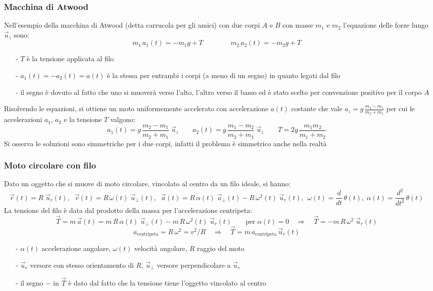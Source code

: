 \documentclass[a4paper]{article}
\newcommand\uz{\vec{u}_z}
\newcommand\ur{\vec{u}_r}
\newcommand\uper{\vec{u}_\perp}
\newcommand\dt{\frac{d}{dt}\,}
\newcommand\dts{\frac{d^2}{dt^2}\,}
\begin{document}
\subsubsection*{Macchina di Atwood}
Nell'esempio della macchina di Atwood (detta carrucola per gli amici) con due corpi \(A\) e \(B\) con masse \(m_1\) e \(m_2\)
l'equazione delle forze lungo \(\uz\) sono:
\[m_1 \, a_1(t) = -m_1 g + T \qquad\qquad m_2 \, a_2(t) = -m_2 g + T \]
\begin{itemize}[topsep=3pt, itemsep=0pt]
	\item[-] \(T\) è la tensione applicata al filo
	\item[-] \(a_1(t) = -a_2(t) = a(t)\) è la stessa per entrambi i corpi (a meno di un segno) in quanto legati dal filo
	\item[-] il	segno è dovuto al fatto che uno si muoverà verso l'alto, l'altro verso il basso ed è stato scelto per convenzione
	positivo per il corpo \(A\)
\end{itemize}
Risolvendo le equazioni, si ottiene un moto uniformemente accelerato con accelerazione \(a(t)\) costante che vale
\(\displaystyle a_z = g \, \frac{m_2 - m_1}{m_2 + m_1}\) per cui le accelerazioni \(a_1\), \(a_2\) e la tensione \(T\) valgono:
\[a_1(t) = g \, \frac{m_2 - m_1}{m_2 + m_1} \; \uz \qquad a_2(t) = g \, \frac{m_1 - m_2}{m_2 + m_1} \; \uz \qquad T = 2g \, \frac{m_1 m_2}{m_1 + m_2}\]
Si osserva le soluzioni sono simmetriche per i due corpi, infatti il problema è simmetrico anche nella realtà

\subsubsection*{Moto circolare con filo}
Dato un oggetto che si muove di moto circolare, vincolato al centro da un filo ideale, si hanno:
\[\vec{r}(t) = R \; \ur(t), \;\; \vec{v}(t) = R \, \omega(t) \; \uper(t), \;\; \vec{a}(t) = R \, \alpha(t) \; \uper(t) - R \, \omega^2(t) \; \ur(t), \;\, \omega(t) = \dt \theta(t), \; \alpha(t) = \dts \theta(t)\]
La tensione del filo è data dal prodotto della massa per l'accelerazione centripeta:
\[\vec{T} = m \, \vec{a}(t) = m \, R \, \alpha(t) \; \uper(t) - m \, R \, \omega^2(t) \; \ur(t) \qquad \text{per} \; \alpha(t) = 0 \quad \Rightarrow \quad \vec{T} = - m \, R \, \omega^2 \; \ur(t)\]
\[a_\text{centripeta} = R \, \omega^2 = v^2/R \quad \Rightarrow \quad \vec{T} = m \, a_\text{centripeta} \, \ur(t)\]
\begin{itemize}[topsep=3pt, itemsep=0pt]
	\item[-] \(\alpha(t)\) accelerazione angolare, \(\omega(t)\) velocità angolare, \(R\) raggio del moto
	\item[-] \(\ur\) versore con stesso orientamento di \(R\), \(\uper\) versore perpendicolare a \(\ur\)
	\item[-] il segno \(-\) in \(\vec{T}\) è dato dal fatto che la tensione tiene l'oggetto vincolato al centro
\end{itemize}
\newpage
\end{document}
